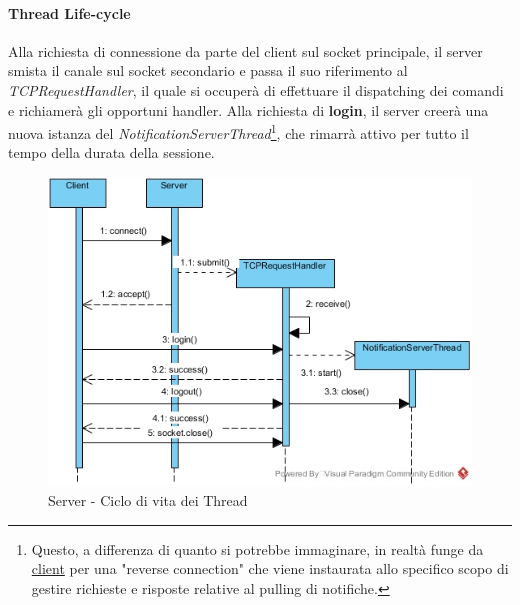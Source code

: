 \paragraph{Thread Life-cycle}
Alla richiesta di connessione da parte del client sul socket principale, il server smista il canale sul socket secondario e passa il suo riferimento al \textit{TCPRequestHandler}, il quale si occuperà di effettuare il dispatching dei comandi e richiamerà gli opportuni handler. Alla richiesta di \textbf{login}, il server creerà una nuova istanza del \textit{NotificationServerThread}\footnote{Questo, a differenza di quanto si potrebbe immaginare, in realtà funge da \underline{client} per una "reverse connection" che viene instaurata allo specifico scopo di gestire richieste e risposte relative al pulling di notifiche.}, che rimarrà attivo per tutto il tempo della durata della sessione.
\begin{figure}[h]
	\caption{Server - Ciclo di vita dei Thread}
	\centering
	\includegraphics[scale=0.5]{assets/server/thread_activation_sequence_diagram}
\end{figure}